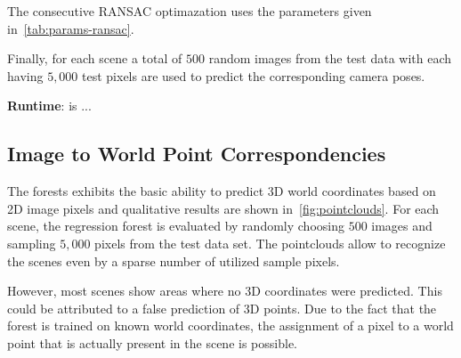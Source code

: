 \documentclass[final]{cvpr}
\begin{document}
The consecutive RANSAC optimazation uses the parameters given in~\ref{tab:params-ransac}. 


Finally, for each scene a total of $500$ random images from the test data with each having $5,000$ test pixels are used
to predict the corresponding camera poses. 

\textbf{Runtime}: is ...



\subsection{Image to World Point Correspondencies}
The forests exhibits the basic ability to predict 3D world coordinates based on 2D image pixels and 
qualitative results are shown in~\ref{fig:pointclouds}. For each scene, the regression forest is evaluated by 
randomly choosing $500$ images and sampling $5,000$ pixels from the test data set. The pointclouds 
allow to recognize the scenes even by a sparse number of utilized sample pixels. 

However, most scenes show areas where no 3D coordinates
were predicted. This could be attributed to a false prediction of 3D points. Due to the fact that the forest is 
trained on known world coordinates, the assignment of a pixel to a world point that is actually present in the 
scene is possible. 
\end{document}
